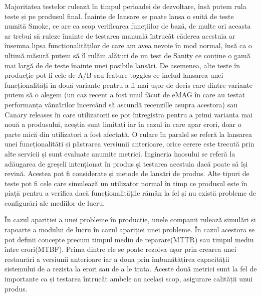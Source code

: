 Majoritatea testelor rulează în timpul perioadei de dezvoltare, însă putem rula teste 
și pe produsul final. Înainte de lansare se poate lansa o suită de teste numită Smoke, ce 
are ca scop verificarea funcțiilor de bază, de multe ori aceasta ar trebui să ruleze înainte de testarea
manuală întrucât căderea acestuia ar însemna lipsa funcționalităților de care am avea nevoie 
în mod normal, însă ca o ultimă măsură putem să îl rulăm alături de un test de Sanity ce conține
o gamă mai largă de de teste înainte unei posibile lansări. De asemenea, alte
teste în producție pot fi cele de A/B sau feature toggles ce includ lansarea unei funcționalități
în două variante pentru a fi mai ușor de decis care dintre variante putem să o alegem (un caz 
recent a fost unul făcut de eMAG în care au testat performanța vânzărilor încercând 
să ascundă recenzille asupra acestora) sau Canary releases în care utilizatorii se pot 
întregistra pentru a primi varianta mai nouă a produsului, aceștia sunt limitați iar în cazul 
în care apar erori, doar o parte mică din utilizatori a fost afectată. O rulare în paralel 
se referă la lansarea unei funcționalități și păstrarea versiunii anterioare, orice cerere este
trecută prin alte servicii și sunt evaluate anumite metrici. Ingineria haosului se referă la adăugarea 
de greșeli intenționat în produs și testarea acestuia dacă poate să își revină. Acestea
pot fi considerate și metode de lansări de produs. Alte tipuri de teste pot fi cele care simulează
un utilizator normal în timp ce produsul este în piață pentru a verifica dacă funcționalitățile rămân 
la fel și nu există probleme de configurări ale mediilor de lucru.

În cazul apariției a unei probleme în producție, unele companii rulează simulări și rapoarte
a modului de lucru în cazul apariției unei probleme. În cazul acestora se pot definii concepte 
precum timpul mediu de reparare(MTTR) sau timpul mediu între erori(MTBF). Prima dintre ele
se poate rezolva ușor prin crearea unei restaurări a versiunii anterioare iar a doua prin 
îmbunătățirea capacității sistemului de a rezista la erori sau de a le trata. Aceste două metrici
sunt la fel de importante ca și testarea întrucât ambele au același scop, asigurare calității 
unui produs.

